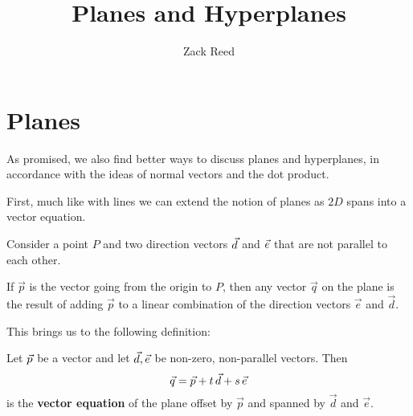 \documentclass{ximera}
\author{Zack Reed}
\title{Planes and Hyperplanes}
\begin{document}
\begin{abstract}


\end{abstract}
\maketitle



\section{Planes}
\label{sec:planes}

As promised, we also find better ways to discuss planes and hyperplanes, in accordance with the ideas of normal vectors and the dot product.

First, much like with lines we can extend the notion of planes as $2D$ spans into a vector equation. 

Consider a point $P$ and two direction
vectors $\vec{d}$ and $\vec{e}$ that are not parallel to each
other. 

If $\vec{p}$ is the vector going from the origin to $P$, then any vector $\vec{q}$ on the plane is the result of adding $\vec{p}$ to a linear combination of the direction vectors $\vec{e}$ and $\vec{d}$.

\begin{center}
\end{center}

This brings us to the following definition: 


\begin{definition}\label{def:vector-equation-of-plane}

  Let $\vec{p}$ be a vector and let $\vec{d},\vec{e}$ be non-zero,
  non-parallel vectors. Then
  \begin{equation*}
    \vec{q} = \vec{p} + t\,\vec{d} + s\,\vec{e}
  \end{equation*}
  is the \textbf{vector equation} of the plane offset by $\vec{p}$ and spanned by $\vec{d}$ and $\vec{e}$.
\end{definition}
\end{document}

